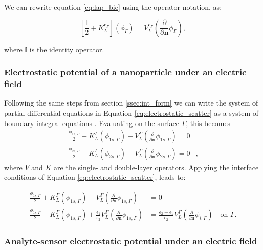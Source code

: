 We can rewrite equation \eqref{eq:lap_bie} using the operator notation, as:

\begin{equation} \label{eq:lap_operator}
\left[ \frac{\mathbb{I}}{2} + K_L^{\mathbf{r}_\Gamma} \right] \left( \phi_\Gamma \right) = V_L^{\mathbf{r}_\Gamma} \left( \frac{\partial}{\partial \mathbf{n}} \phi_\Gamma \right),
\end{equation}

where $\mathbb{I}$ is the identity operator.

\subsubsection{Electrostatic potential of a nanoparticle under an electric field} \label{sec:pot_elec_field}

Following the same steps from section \ref{ssec:int_form}  we can write the system of partial differential equations 
in Equation \eqref{eq:electrostatic_scatter} as a system of boundary integral equations \cite{BrebbiaDominguez1992}. Evaluating on the
surface $\Gamma$, this becomes
%
\begin{align} \label{eq:integral_eq_lspr_nobc}
\frac{\phi_{1s,\Gamma}}{2}+ K_{L}^{\Gamma}(\phi_{1s,\Gamma}) - V_{L}^{\Gamma} \left(\frac{\partial}{\partial \mathbf{n}}\phi_{1s,\Gamma} \right) = 0&  \nonumber \\
\frac{\phi_{2s,\Gamma}}{2} - K_{L}^{\Gamma}(\phi_{2s,\Gamma}) + V_{L}^{\Gamma} \left( \frac{\partial}{\partial \mathbf{n}} \phi_{2s,\Gamma} \right) = 0&,
\end{align}
%
where $V$ and $K$ are the single- and double-layer operators.
%
Applying the interface conditions of Equation \eqref{eq:electrostatic_scatter},
leads to:

\begin{align} \label{eq:integral_eq_lspr}
\frac{\phi_{1s,\Gamma}}{2}+ K_{L}^{\Gamma}(\phi_{1s,\Gamma}) - V_{L}^{\Gamma} \left(\frac{\partial}{\partial \mathbf{n}}\phi_{1s,\Gamma} \right) &= 0  \nonumber \\
\frac{\phi_{1s,\Gamma}}{2} - K_{L}^{\Gamma}(\phi_{1s,\Gamma}) + \frac{\epsilon_1}{\epsilon_2}V_{L}^{\Gamma} \left( \frac{\partial}{\partial \mathbf{n}} \phi_{1s,\Gamma}  \right) &=
 \frac{\epsilon_2-\epsilon_1}{\epsilon_2}V_{L}^{\Gamma}\left( \frac{\partial}{\partial \mathbf{n}} \phi_{i,\Gamma} \right)\quad \text{on $\Gamma$.}
\end{align}


\subsubsection{Analyte-sensor electrostatic potential under an electric field}

